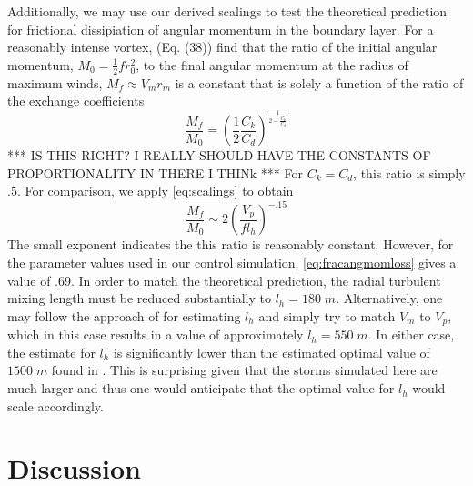 \documentclass[12pt]{article}
\begin{document}
Additionally, we may use our derived scalings to test the theoretical prediction for frictional dissipiation of angular momentum in the boundary layer.  For a reasonably intense vortex, \cite{Emanuel_Rotunno_2011} (Eq. (38)) find that the ratio of the initial angular momentum, $M_0 = \frac{1}{2}fr_0^2$, to the final angular momentum at the radius of maximum winds, $M_f \approx V_mr_m$ is a constant that is solely a function of the ratio of the exchange coefficients
\begin{equation}
\label{eq:ER11}
\frac{M_f}{M_0} = \left(\frac{1}{2}\frac{C_k}{C_d}\right)^\frac{1}{2-\frac{C_k}{C_d}}
\end{equation}
*** IS THIS RIGHT? I REALLY SHOULD HAVE THE CONSTANTS OF PROPORTIONALITY IN THERE I THINk *** For $C_k = C_d$, this ratio is simply $.5$.  For comparison, we apply \eqref{eq:scalings} to obtain
\begin{equation}
\label{eq:fracangmomloss}
\frac{M_f}{M_0} \sim 2\left(\frac{V_p}{fl_h}\right)^{-.15}
\end{equation}
The small exponent indicates the this ratio is reasonably constant.  However, for the parameter values used in our control simulation, \eqref{eq:fracangmomloss} gives a value of $.69$.  In order to match the theoretical prediction, the radial turbulent mixing length must be reduced substantially to $l_h = 180 \; m$.  Alternatively, one may follow the approach of \citep{Bryan_Rotunno_2009b} for estimating $l_h$ and simply try to match $V_m$ to $V_p$, which in this case results in a value of approximately $l_h = 550 \; m$.  In either case, the estimate for $l_h$ is significantly lower than the estimated optimal value of $1500 \; m$ found in \citep{Bryan_Rotunno_2009b}.  This is surprising given that the storms simulated here are much larger and thus one would anticipate that the optimal value for $l_h$ would scale accordingly.




\section{Discussion}
\end{document}
